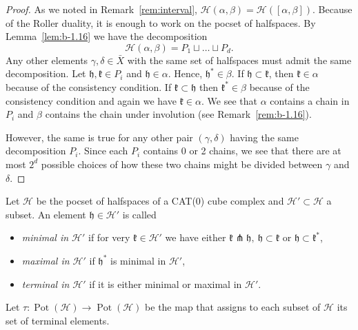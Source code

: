 \begin{proof}
  As we noted in Remark~\ref{rem:interval}, \(\mathcal{H}(\alpha,\beta) = \mathcal{H}([\alpha, \beta])\). Because of the Roller duality, it is enough to work on the pocset of halfspaces. By Lemma~\ref{lem:b-1.16} we have the decomposition
  \[
    \mathcal{H}(\alpha, \beta) = P_1 \sqcup \dots \sqcup P_d.
  \]
  Any other elements \(\gamma, \delta \in \bar X\) with the same set of halfspaces must admit the same decomposition. Let \(\mathfrak{h}, \mathfrak{k} \in P_i\) and \(\mathfrak{h} \in \alpha\). Hence, \(\mathfrak{h}^\ast \in \beta\). If \(\mathfrak{h} \subset \mathfrak{k}\), then \(\mathfrak{k} \in \alpha\) because of the consistency condition. If \(\mathfrak{k} \subset \mathfrak{h}\) then \(\mathfrak{k}^\ast \in \beta\) because of the consistency condition and again we have \(\mathfrak{k} \in \alpha\). We see that \(\alpha\) contains a chain in \(P_i\)  and \(\beta\) contains the chain under involution (see Remark~\ref{rem:b-1.16}).

  However, the same is true for any other pair \((\gamma, \delta)\) having the same decomposition \(P_i\). Since each \(P_i\) contains 0 or 2 chains, we see that there are at most \(2^d\) possible choices of how these two chains might be divided between \(\gamma\) and \(\delta\).
\end{proof}

\begin{defin}
  \label{defin:tau}
  Let \(\mathcal{H}\) be the pocset of halfspaces of a CAT(0) cube complex and \(\mathcal{H}' \subset \mathcal{H}\) a subset. An element \(\mathfrak{h} \in \mathcal{H}'\) is called
  \begin{itemize}
  \item \emph{minimal in \(\mathcal{H}'\)} if for very \(\mathfrak{k} \in \mathcal{H'}\) we have either \(\mathfrak{k} \pitchfork \mathfrak{h},\ \mathfrak{h} \subset \mathfrak{k}\) or \(\mathfrak{h} \subset \mathfrak{k}^\ast\),
  \item \emph{maximal in \(\mathcal{H}'\)} if \(\mathfrak{h}^\ast\) is minimal in \(\mathcal{H}'\),
  \item \emph{terminal in \(\mathcal{H}'\)} if it is either minimal or maximal in \(\mathcal{H}'\).
  \end{itemize}
  Let \(\tau\colon \operatorname{Pot}(\mathcal{H}) \to \operatorname{Pot}(\mathcal{H})\) be the map that assigns to each subset of \(\mathcal{H}\) its set of terminal elements.
\end{defin}

